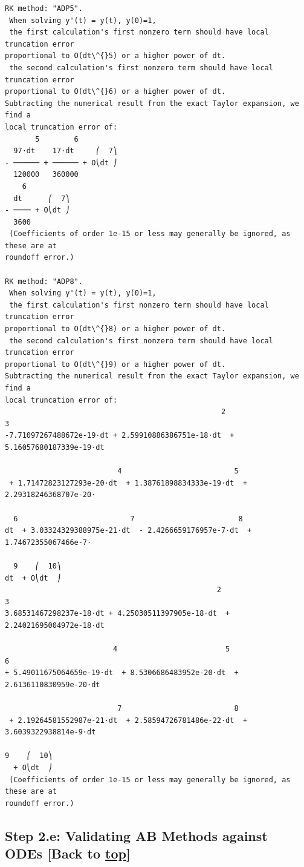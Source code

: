 \documentclass[landscape,letterpaper,10pt,english]{article}
\begin{document}
\begin{Verbatim}[commandchars=\\\{\}]
RK method: "ADP5".
 When solving y'(t) = y(t), y(0)=1,
 the first calculation's first nonzero term should have local truncation error
proportional to O(dt\^{}5) or a higher power of dt.
 the second calculation's first nonzero term should have local truncation error
proportional to O(dt\^{}6) or a higher power of dt.
Subtracting the numerical result from the exact Taylor expansion, we find a
local truncation error of:
       5        6
  97⋅dt    17⋅dt     ⎛  7⎞
- ────── + ────── + O⎝dt ⎠
  120000   360000
    6
  dt      ⎛  7⎞
- ──── + O⎝dt ⎠
  3600
 (Coefficients of order 1e-15 or less may generally be ignored, as these are at
roundoff error.)

RK method: "ADP8".
 When solving y'(t) = y(t), y(0)=1,
 the first calculation's first nonzero term should have local truncation error
proportional to O(dt\^{}8) or a higher power of dt.
 the second calculation's first nonzero term should have local truncation error
proportional to O(dt\^{}9) or a higher power of dt.
Subtracting the numerical result from the exact Taylor expansion, we find a
local truncation error of:
                                                  2                          3
-7.71097267488672e-19⋅dt + 2.59910886386751e-18⋅dt  + 5.16057680187339e-19⋅dt

                          4                          5
 + 1.71472823127293e-20⋅dt  + 1.38761898834333e-19⋅dt  + 2.29318246368707e-20⋅

  6                          7                        8
dt  + 3.03324329388975e-21⋅dt  - 2.4266659176957e-7⋅dt  + 1.74672355067466e-7⋅

  9    ⎛  10⎞
dt  + O⎝dt  ⎠
                                                 2                          3
3.68531467298237e-18⋅dt + 4.25030511397905e-18⋅dt  + 2.24021695004972e-18⋅dt

                         4                         5                         6
+ 5.49011675064659e-19⋅dt  + 8.5306686483952e-20⋅dt  + 2.6136110830959e-20⋅dt

                          7                          8
 + 2.19264581552987e-21⋅dt  + 2.58594726781486e-22⋅dt  + 3.6039322938814e-9⋅dt

9    ⎛  10⎞
  + O⎝dt  ⎠
 (Coefficients of order 1e-15 or less may generally be ignored, as these are at
roundoff error.)

    \end{Verbatim}

    \hypertarget{step-2.e-validating-ab-methods-against-odes-back-to-top}{%
\subsection{\texorpdfstring{Step 2.e: Validating AB Methods against ODEs
{[}Back to
\hyperref[toc]{top}{]}}{Step 2.e: Validating AB Methods against ODEs {[}Back to {]}}}\label{step-2.e-validating-ab-methods-against-odes-back-to-top}}
\end{document}
